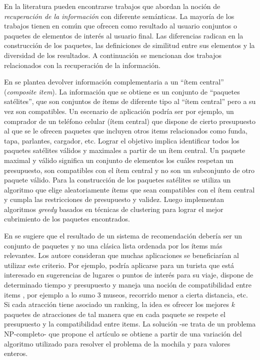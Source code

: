 En la literatura pueden encontrarse trabajos que abordan la noción de \emph{recuperación de la información} con diferente semánticas. La mayoría de los trabajos tienen en común que ofrecen como resultado al usuario conjuntos o paquetes de elementos de interés al usuario final. Las diferencias radican en la construcción de los paquetes, las definiciones de similitud entre sus elementos y la diversidad de los resultados. A continuación se mencionan dos trabajos relacionados con la recuperación de la información.

En \cite{BasuRoy:2010:CEC:1807167.1807258} se plantea devolver información complementaria a un ``ítem central'' (\textit{composite item}). La información que se obtiene es un conjunto de ``paquetes satélites'', que son conjuntos de ítems de diferente tipo al ``ítem central'' pero a su vez son compatibles. Un escenario de aplicación podría ser por ejemplo, un comprador de un teléfono celular (ítem central) que dispone de cierto presupuesto al que se le ofrecen paquetes que incluyen otros items relacionados como funda, tapa, parlantes, cargador, etc. Lograr el objetivo implica identificar todos los paquetes satélites válidos y maximales a partir de un ítem central. Un paquete maximal y válido significa un conjunto de elementos los cuáles respetan un presupuesto, son compatibles con el ítem central y no son un subconjunto de otro paquete válido. Para la construcción de los paquetes satélites se utiliza un algoritmo que elige aleatoriamente ítems que sean compatibles con el ítem central y cumpla las restricciones de presupuesto y validez. Luego implementan algoritmos \emph{greedy} basados en técnicas de clustering para lograr el mejor cubrimiento de los paquetes encontrados.

En \cite{Xie:2010:BOB:1864708.1864739} se sugiere que el resultado de un sistema de recomendación debería ser un conjunto de paquetes y no una clásica lista ordenada por los ítems más relevantes. Los autore consideran que muchas aplicaciones se beneficiarían al utilizar este criterio. Por ejemplo, podría aplicarse para un turista que está interesado en sugerencias de lugares o puntos de interés para su viaje, dispone de determinado tiempo y presupuesto y maneja una noción de compatibilidad entre items , por ejemplo a lo sumo 3 museos, recorrido menor a cierta distancia, etc. Si cada atracción tiene asociado un ranking, la idea es ofrecer los mejores $k$ paquetes de atracciones de tal manera que en cada paquete se respete el presupuesto y la compatibilidad entre items. La solución -se trata de un problema NP-completo- que propone el artículo se obtiene a partir de una variación del  algoritmo utilizado para resolver el problema de la mochila \cite{DBLP:conf/coco/Karp72} y \cite{Gossett:2009:DMP:1717238} para valores enteros. 

